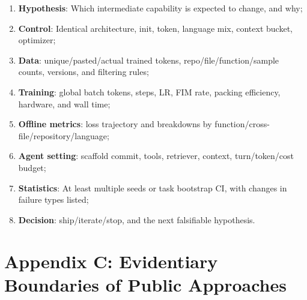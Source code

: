 \documentclass[10pt,a4paper,UTF8,fontset=none]{ctexart}
\begin{document}
\begin{enumerate}
  \item \textbf{Hypothesis}: Which intermediate capability is expected to change, and why;
  \item \textbf{Control}: Identical architecture, init, token, language mix, context bucket, optimizer;
  \item \textbf{Data}: unique/pasted/actual trained tokens, repo/file/function/sample counts, versions, and filtering rules;
  \item \textbf{Training}: global batch tokens, steps, LR, FIM rate, packing efficiency, hardware, and wall time;
  \item \textbf{Offline metrics}: loss trajectory and breakdowns by function/cross-file/repository/language;
  \item \textbf{Agent setting}: scaffold commit, tools, retriever, context, turn/token/cost budget;
  \item \textbf{Statistics}: At least multiple seeds or task bootstrap CI, with changes in failure types listed;
  \item \textbf{Decision}: ship/iterate/stop, and the next falsifiable hypothesis.
\end{enumerate}

\section{Appendix C: Evidentiary Boundaries of Public Approaches}
\end{document}
